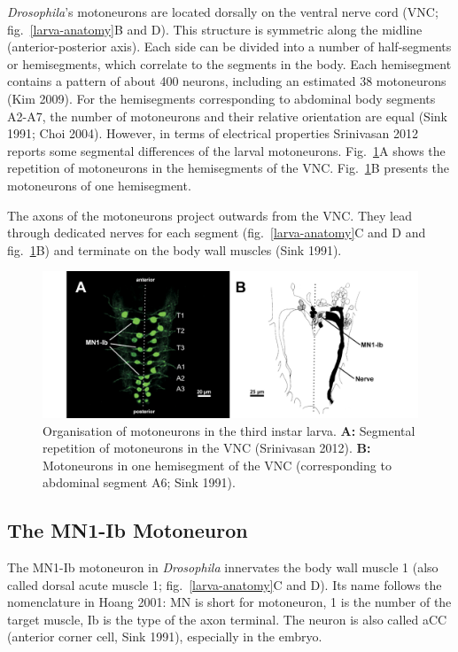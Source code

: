 \documentclass[12pt,a4paper,]{report}
\begin{document}
\emph{Drosophila}'s motoneurons are located dorsally on the ventral
nerve cord (VNC; fig.~\ref{larva-anatomy}B and D). This structure is
symmetric along the midline (anterior-posterior axis). Each side can be
divided into a number of half-segments or hemisegments, which correlate
to the segments in the body. Each hemisegment contains a pattern of
about 400 neurons, including an estimated 38 motoneurons (Kim 2009). For
the hemisegments corresponding to abdominal body segments A2-A7, the
number of motoneurons and their relative orientation are equal (Sink
1991; Choi 2004). However, in terms of electrical properties Srinivasan
2012 reports some segmental differences of the larval motoneurons.
Fig.~\ref{motoneurons}A shows the repetition of motoneurons in the
hemisegments of the VNC. Fig.~\ref{motoneurons}B presents the
motoneurons of one hemisegment.

The axons of the motoneurons project outwards from the VNC. They lead
through dedicated nerves for each segment (fig.~\ref{larva-anatomy}C and
D and fig.~\ref{motoneurons}B) and terminate on the body wall muscles
(Sink 1991).

\begin{figure}
\centering
\includegraphics[]{images/motoneurons.png}
\caption[Organisation of motoneurons in the third instar larva]{Organisation of motoneurons in the third instar larva.
\textbf{A:} Segmental repetition of motoneurons in the VNC (Srinivasan
2012). \textbf{B:} Motoneurons in one hemisegment of the VNC
(corresponding to abdominal segment A6; Sink 1991).}\label{motoneurons}
\end{figure}

\subsection{The MN1-Ib Motoneuron}\label{the-mn1-ib-motoneuron}

The MN1-Ib motoneuron in \emph{Drosophila} innervates the body wall
muscle 1 (also called dorsal acute muscle 1; fig.~\ref{larva-anatomy}C
and D). Its name follows the nomenclature in Hoang 2001: MN is short for
motoneuron, 1 is the number of the target muscle, Ib is the type of the
axon terminal. The neuron is also called aCC (anterior corner cell, Sink
1991), especially in the embryo.
\end{document}
